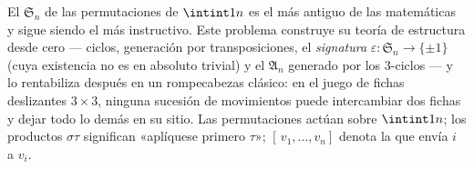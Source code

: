 \begin{problem}\label{pb:b1:structures:1}
El  $\mathfrak S_n$ de las permutaciones de $\intint1n$ es el
 más antiguo de las matemáticas y sigue siendo el más
instructivo. Este problema construye su teoría de estructura desde cero
--- ciclos, generación por transposiciones, el 
\emph{signatura} $\varepsilon \colon \mathfrak S_n \to \{\pm1\}$ (cuya
existencia no es en absoluto trivial) y el 
$\mathfrak A_n$ generado por los $3$-ciclos --- y lo rentabiliza después
en un rompecabezas clásico: en el juego de fichas deslizantes
$3 \times 3$, ninguna sucesión de movimientos puede intercambiar dos
fichas y dejar todo lo demás en su sitio.
Las permutaciones actúan sobre $\intint1n$; los productos
$\sigma\tau$ significan «aplíquese primero $\tau$»; $[\,v_1, \dots,
v_n]$ denota la  que envía $i$ a $v_i$.


\end{problem}
